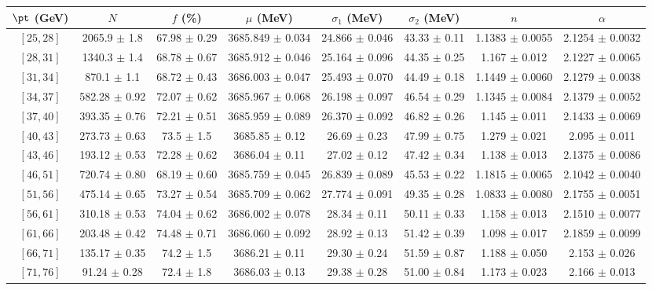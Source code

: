 \begin{tabular}{c||c|c|c|c|c|c|c}
$\pt$ (GeV) & $N$ & $f$ (\%) & $\mu$ (MeV) & $\sigma_1$ (MeV) & $\sigma_2$ (MeV) & $n$ & $\alpha$ \\
\hline
$[25, 28]$ & 2065.9 $\pm$ 1.8 & 67.98 $\pm$ 0.29 & 3685.849 $\pm$ 0.034 & 24.866 $\pm$ 0.046 & 43.33 $\pm$ 0.11 & 1.1383 $\pm$ 0.0055 & 2.1254 $\pm$ 0.0032\\
$[28, 31]$ & 1340.3 $\pm$ 1.4 & 68.78 $\pm$ 0.67 & 3685.912 $\pm$ 0.046 & 25.164 $\pm$ 0.096 & 44.35 $\pm$ 0.25 & 1.167 $\pm$ 0.012 & 2.1227 $\pm$ 0.0065\\
$[31, 34]$ & 870.1 $\pm$ 1.1 & 68.72 $\pm$ 0.43 & 3686.003 $\pm$ 0.047 & 25.493 $\pm$ 0.070 & 44.49 $\pm$ 0.18 & 1.1449 $\pm$ 0.0060 & 2.1279 $\pm$ 0.0038\\
$[34, 37]$ & 582.28 $\pm$ 0.92 & 72.07 $\pm$ 0.62 & 3685.967 $\pm$ 0.068 & 26.198 $\pm$ 0.097 & 46.54 $\pm$ 0.29 & 1.1345 $\pm$ 0.0084 & 2.1379 $\pm$ 0.0052\\
$[37, 40]$ & 393.35 $\pm$ 0.76 & 72.21 $\pm$ 0.51 & 3685.959 $\pm$ 0.089 & 26.370 $\pm$ 0.092 & 46.82 $\pm$ 0.26 & 1.145 $\pm$ 0.011 & 2.1433 $\pm$ 0.0069\\
$[40, 43]$ & 273.73 $\pm$ 0.63 & 73.5 $\pm$ 1.5 & 3685.85 $\pm$ 0.12 & 26.69 $\pm$ 0.23 & 47.99 $\pm$ 0.75 & 1.279 $\pm$ 0.021 & 2.095 $\pm$ 0.011\\
$[43, 46]$ & 193.12 $\pm$ 0.53 & 72.28 $\pm$ 0.62 & 3686.04 $\pm$ 0.11 & 27.02 $\pm$ 0.12 & 47.42 $\pm$ 0.34 & 1.138 $\pm$ 0.013 & 2.1375 $\pm$ 0.0086\\
$[46, 51]$ & 720.74 $\pm$ 0.80 & 68.19 $\pm$ 0.60 & 3685.759 $\pm$ 0.045 & 26.839 $\pm$ 0.089 & 45.53 $\pm$ 0.22 & 1.1815 $\pm$ 0.0065 & 2.1042 $\pm$ 0.0040\\
$[51, 56]$ & 475.14 $\pm$ 0.65 & 73.27 $\pm$ 0.54 & 3685.709 $\pm$ 0.062 & 27.774 $\pm$ 0.091 & 49.35 $\pm$ 0.28 & 1.0833 $\pm$ 0.0080 & 2.1755 $\pm$ 0.0051\\
$[56, 61]$ & 310.18 $\pm$ 0.53 & 74.04 $\pm$ 0.62 & 3686.002 $\pm$ 0.078 & 28.34 $\pm$ 0.11 & 50.11 $\pm$ 0.33 & 1.158 $\pm$ 0.013 & 2.1510 $\pm$ 0.0077\\
$[61, 66]$ & 203.48 $\pm$ 0.42 & 74.48 $\pm$ 0.71 & 3686.060 $\pm$ 0.092 & 28.92 $\pm$ 0.13 & 51.42 $\pm$ 0.39 & 1.098 $\pm$ 0.017 & 2.1859 $\pm$ 0.0099\\
$[66, 71]$ & 135.17 $\pm$ 0.35 & 74.2 $\pm$ 1.5 & 3686.21 $\pm$ 0.11 & 29.30 $\pm$ 0.24 & 51.59 $\pm$ 0.87 & 1.188 $\pm$ 0.050 & 2.153 $\pm$ 0.026\\
$[71, 76]$ & 91.24 $\pm$ 0.28 & 72.4 $\pm$ 1.8 & 3686.03 $\pm$ 0.13 & 29.38 $\pm$ 0.28 & 51.00 $\pm$ 0.84 & 1.173 $\pm$ 0.023 & 2.166 $\pm$ 0.013\\

\end{tabular}

